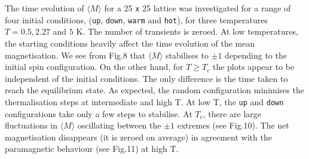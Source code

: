 \documentclass[a4paper]{article}
\begin{document}
The time evolution of  $ \langle M \rangle$ for a 25 \small \verb;x; \normalsize 25 lattice was investigated for a range of four initial conditions, (\verb;up;, \verb;down;, \verb;warm; and \verb;hot;), for three temperatures  $T = 0.5, 2.27$ and $5$ K. The number of transients is zeroed. At low temperatures, the starting conditions heavily affect the time evolution of the mean magnetisation. We see from Fig.8 that $ \langle M \rangle$ stabilises to $\pm 1$ depending to the initial spin configuration. On the other hand, for $T \geq T_c$ the plots appear to be independent of the initial conditions. The only difference is the time taken to reach the equilibrium state. As expected, the random configuration minimises the thermalisation steps at intermediate and high T. At low T, the \verb;up; and  \verb;down; configurations take only a few steps to stabilise. At $T_c$, there are large fluctuations in $ \langle M \rangle$ oscillating between the $\pm 1$ extremes (see Fig.10). The net magnetisation disappears (it is zeroed on average) in agreement with the paramagnetic behaviour (see Fig.11) at high T.

\vspace{0.4cm}
\end{document}
